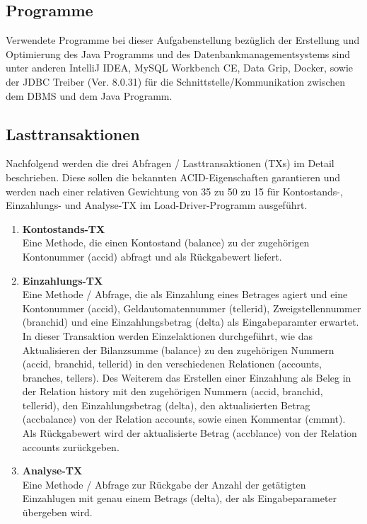 \subsection{Programme}\label{subsec:programme}
Verwendete Programme bei dieser Aufgabenstellung bezüglich der Erstellung und Optimierung des Java Programms und des Datenbankmanagementsystems sind unter anderen IntelliJ IDEA, MySQL Workbench CE, Data Grip, Docker, sowie der JDBC Treiber (Ver. 8.0.31) für die Schnittstelle/Kommunikation zwischen dem DBMS und dem Java Programm.
\subsection{Lasttransaktionen}\label{subsec:lasttransaktionen}
Nachfolgend werden die drei Abfragen / Lasttransaktionen (TXs) im Detail beschrieben.
Diese sollen die bekannten ACID-Eigenschaften garantieren und werden nach einer relativen Gewichtung von 35 zu 50 zu 15 für Kontostands-, Einzahlungs- und Analyse-TX im Load-Driver-Programm ausgeführt.
\begin{enumerate}
    \item \textbf{Kontostands-TX} \\
    Eine Methode, die einen Kontostand (balance) zu der zugehörigen Kontonummer (accid) abfragt und als Rückgabewert liefert.
    \item \textbf{Einzahlungs-TX} \\
    Eine Methode / Abfrage, die als Einzahlung eines Betrages agiert und eine Kontonummer (accid), Geldautomatennummer (tellerid), Zweigstellennummer (branchid) und eine Einzahlungsbetrag (delta) als Eingabeparamter erwartet.
    In dieser Transaktion werden Einzelaktionen durchgeführt, wie das Aktualisieren der Bilanzsumme (balance) zu den zugehörigen Nummern (accid, branchid, tellerid) in den verschiedenen Relationen (accounts, branches, tellers).
    Des Weiterem das Erstellen einer Einzahlung als Beleg in der Relation history mit den zugehörigen Nummern (accid, branchid, tellerid), den Einzahlungsbetrag (delta), den aktualisierten Betrag (accbalance) von der Relation accounts, sowie einen Kommentar (cmmnt).
    Als Rückgabewert wird der aktualisierte Betrag (accblance) von der Relation accounts zurückgeben.
    \item \textbf{Analyse-TX} \\
    Eine Methode / Abfrage zur Rückgabe der Anzahl der getätigten Einzahlugen mit genau einem Betrags (delta), der als Eingabeparameter übergeben wird.
\end{enumerate}


